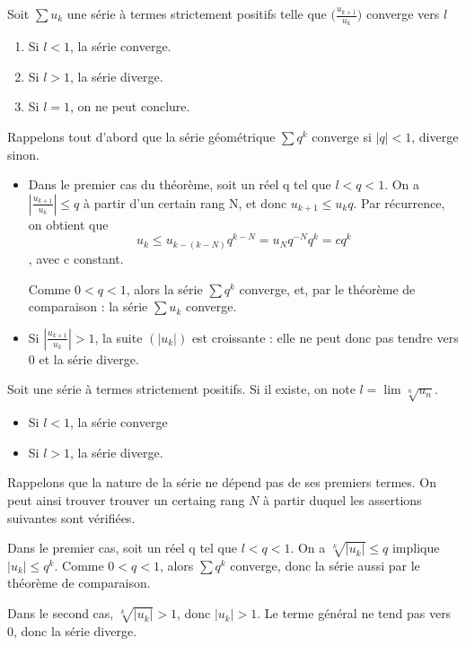 \documentclass[french]{yLectureNote}
\begin{document}
\begin{theorem}
Soit $\sum u_k$ une série à termes strictement positifs telle que \(\big(\frac{u_{k+1}}{u_{k}}\big)\) converge vers \(l\)
\begin{enumerate}
\item Si \(l < 1\), la série converge.
\item Si \(l > 1\), la série diverge.
\item Si \(l = 1\), on ne peut conclure.
\end{enumerate}
\end{theorem}
\begin{myproof}
Rappelons tout d'abord que la série géométrique $\sum q^k$
converge si $|q|<1$, diverge sinon.
\begin{itemize}
 \item Dans le premier cas du théorème, soit un réel q tel que \(l<q<1\). On a $\left|\frac{u_{k+1}}{u_k}\right| \leq q$ à partir d'un certain rang N, et donc \(u_{k+1}\leq u_kq\). Par récurrence, on obtient que \[u_k \leq u_{k-(k-N)}q^{k-N}=u_Nq^{-N}q^k=cq^k\], avec c constant.

Comme $0 < q < 1$, alors la série $\sum q^k$ converge, et,
par le théorème de comparaison :
la série $\sum u_k$ converge.
 \item Si $\left|\frac{u_{k+1}}{u_k}\right| > 1$, la suite $(|u_k|)$ est croissante : elle ne
peut donc pas tendre vers $0$ et la série diverge.
\end{itemize}
\end{myproof}
\begin{theorem}
 Soit une série à termes strictement positifs. Si il existe, on note \(l = \lim \sqrt[n]{u_n}\).
 \begin{itemize}
  \item  Si \(l<1\), la série converge
  \item Si \(l>1\), la série diverge.
 \end{itemize}
\end{theorem}
\begin{myproof}
Rappelons que la nature de la série ne dépend pas de ses premiers
termes. On peut ainsi trouver trouver un certaing rang $N$ à partir duquel les assertions suivantes sont vérifiées.

Dans le premier cas, soit un réel q tel que \(l<q<1\). On a $\sqrt[k]{|u_k|} \le q$
implique  $|u_k| \le q^k$. Comme $0<q<1$, alors $\sum q^k$ converge, donc la série aussi
par le théorème  de comparaison.

Dans le second cas, $\sqrt[k]{|u_k|} > 1$, donc $|u_k| > 1$.
Le terme général ne tend pas vers $0$, donc la série diverge.

\end{myproof}
\end{document}
